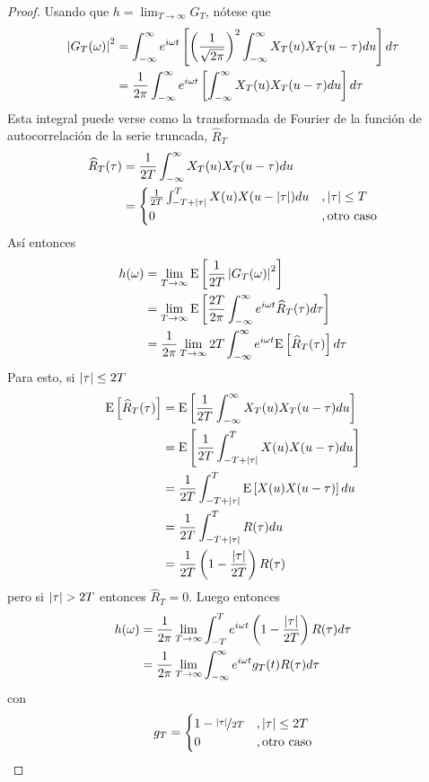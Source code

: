 \begin{proof}
Usando que $h = \lim_{T\rightarrow\infty} G_T$, nótese que
\begin{align*}
\left| G_T(\omega) \right|^{2} &= 
\int_{-\infty}^{\infty} e^{i \omega t} \left[ \left(\frac{1}{\sqrt{2\pi}} \right)^{2} \int_{-\infty}^{\infty} X_T(u) X_T(u-\tau) du \right] d\tau \\
&=
\frac{1}{2\pi} \int_{-\infty}^{\infty} e^{i \omega t} \left[ \int_{-\infty}^{\infty} X_T(u) X_T(u-\tau) du \right] d\tau \\
\end{align*}
Esta integral puede verse como la transformada de Fourier de la función de autocorrelación de la serie truncada, $\widehat{R}_T$
\begin{align*}
\widehat{R}_T (\tau) &= \frac{1}{2T} \int_{-\infty}^{\infty} X_T(u) X_T(u-\tau) du \\
&= \begin{cases}
\frac{1}{2T} \int_{-T+\left| \tau \right|}^{T} X(u) X(u-\left| \tau \right|) du &, \left| \tau \right| \leq T \\
0 &, \text{otro caso}
\end{cases}
\end{align*}
Así entonces
\begin{align*}
h(\omega) &=
\lim_{T\rightarrow \infty} \mathrm{E}\left[ \frac{1}{2T} \left| G_T(\omega) \right|^{2} \right] \\
&=
\lim_{T\rightarrow \infty}
\mathrm{E}\left[ \frac{2T}{2\pi} \int_{-\infty}^{\infty} e^{i \omega t} \widehat{R}_T(\tau) d\tau  \right]\\
&=
\frac{1}{2\pi}
\lim_{T\rightarrow \infty}
2T \int_{-\infty}^{\infty} e^{i \omega t} \mathrm{E}\left[ \widehat{R}_T(\tau) \right] d\tau\\
\end{align*}
Para esto, si $\left| \tau \right| \leq 2T$
\begin{align*}
\mathrm{E}\left[ \widehat{R}_T(\tau) \right] &=
\mathrm{E}\left[ \frac{1}{2T} \int_{-\infty}^{\infty} X_T(u) X_T(u-\tau) du \right] \\
&=
\mathrm{E}\left[  \frac{1}{2T} \int_{-T+\left| \tau \right|}^{T} X(u) X(u-\tau) du  \right] \\
&=
\frac{1}{2T} \int_{-T+\left| \tau \right|}^{T} \mathrm{E}\left[ X(u) X(u-\tau) \right] du \\
&=
\frac{1}{2T} \int_{-T+\left| \tau \right|}^{T} R(\tau) du \\
&=
\frac{1}{2T} \left( 1 - \frac{\left| \tau \right|}{2T} \right) R(\tau)
\end{align*}
pero si $\abso{\tau}>2T$ entonces $\widehat{R}_T = 0$. Luego entonces
\begin{align*}
h(\omega) &=
\frac{1}{2\pi} \lim_{T\rightarrow \infty}
\int_{-T}^{T} e^{i \omega t} \left( 1 - \frac{\left| \tau \right|}{2T} \right) R(\tau) d\tau\\
&=
\frac{1}{2\pi} \lim_{T\rightarrow \infty}
\int_{-\infty}^{\infty} e^{i \omega t} g_T(t) R(\tau) d\tau
\end{align*}
con
\begin{equation}
g_T = \begin{cases}
1 - \nicefrac{\left| \tau \right|}{2T} &, \left| \tau \right| \leq 2T \\
0 &, \text{otro caso}
\end{cases}
\end{equation}


\end{proof}
